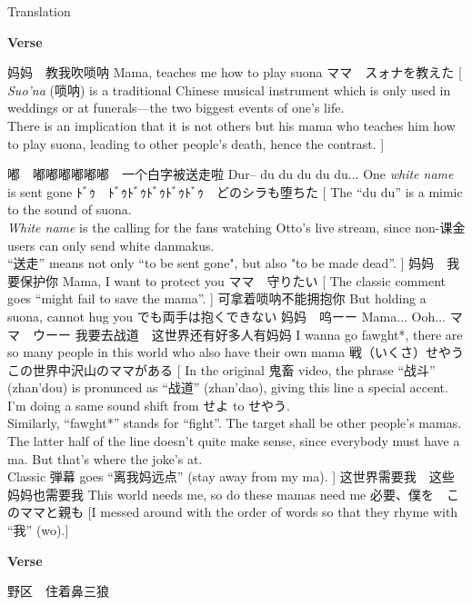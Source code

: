 \documentclass{ctexart}
\newenvironment{lverse}
	{
		\par
		\textbf{\LARGE Verse}
		\vspace{.5em}
		\par
	}
	{
		\par
	}
\begin{document}
\begin{section}{Translation}
	\begin{lverse}
		\lline
			{妈妈　教我吹唢呐}
			{Mama, teaches me how to play suona}
			{ママ　スォナを教えた}
			[
				\textit{Suo'na} (唢呐) is a traditional Chinese musical instrument which is only used in weddings or at funerals---the two biggest events of one's life. \\
				There is an implication that it is not others but his mama who teaches him how to play suona, leading to other people's death, hence the contrast.
			]

		\lline
			{嘟　嘟嘟嘟嘟嘟嘟　一个白字被送走啦}
			{Dur-- du du du du du... One \textit{white name} is sent gone}
			{ﾄﾞｩ　ﾄﾞｩﾄﾞｩﾄﾞｩﾄﾞｩﾄﾞｩ　どのシラも堕ちた}
			[
				The “du du” is a mimic to the sound of suona. \\
				\textit{White name} is the calling for the fans watching Otto's live stream, since non-课金 users can only send white danmakus. \\
				“送走” means not only “to be sent gone", but also "to be made dead”.
			]
		\lline
			{妈妈　我要保护你}
			{Mama, I want to protect you}
			{ママ　守りたい}
			[
				The classic comment goes “might fail to save the mama”.
			]
		\lline
			{可拿着唢呐不能拥抱你}
			{But holding a suona, cannot hug you}
			{でも両手は抱くできない}
		\lline
			{妈妈　呜ーー}
			{Mama... Ooh...}
			{ママ　ウーー}
		\lline
			{我要去战道　这世界还有好多人有妈妈}
			{I wanna go fawght*, there are so many people in this world who also have their own mama}
			{戦（いくさ）せやう　この世界中沢山のママがある}
			[
				In the original 鬼畜 video, the phrase “战斗” (zhan'dou) is pronunced as “战道” (zhan'dao), giving this line a special accent.
				I'm doing a same sound shift from せよ to せやう. \\
				Similarly, “fawght*” stands for “fight”.
				The target shall be other people's mamas. \\
				The latter half of the line doesn't quite make sense, since everybody must have a ma.
				But that's where the joke's at. \\
				Classic 弾幕 goes “离我妈远点” (stay away from my ma).
			]
		\lline
			{这世界需要我　这些妈妈也需要我}
			{This world needs me, so do these mamas need me}
			{必要、僕を　このママと親も}
			[I messed around with the order of words so that they rhyme with “我” (wo).]
	\end{lverse}
	\begin{lverse}
		\lline
			{野区　住着鼻三狼}

\end{lverse}
\end{section}
\end{document}
